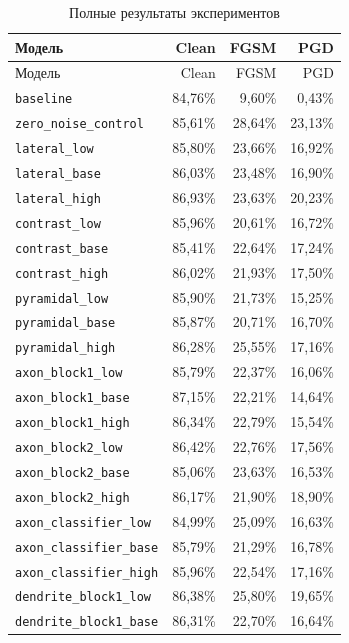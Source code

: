 \documentclass[a4paper]{article}
\begin{document}
\small
\begin{longtable}{p{5.6cm}rrr}
\caption{Полные результаты экспериментов}\label{tab:all-results}\\
\toprule
Модель & Clean & FGSM & PGD\\
\midrule
\endfirsthead
\toprule
Модель & Clean & FGSM & PGD\\
\midrule
\endhead
\texttt{baseline} & 84{,}76\% & 9{,}60\% & 0{,}43\%\\
\texttt{zero\_noise\_control} & 85{,}61\% & 28{,}64\% & 23{,}13\%\\
\texttt{lateral\_low} & 85{,}80\% & 23{,}66\% & 16{,}92\%\\
\texttt{lateral\_base} & 86{,}03\% & 23{,}48\% & 16{,}90\%\\
\texttt{lateral\_high} & 86{,}93\% & 23{,}63\% & 20{,}23\%\\
\texttt{contrast\_low} & 85{,}96\% & 20{,}61\% & 16{,}72\%\\
\texttt{contrast\_base} & 85{,}41\% & 22{,}64\% & 17{,}24\%\\
\texttt{contrast\_high} & 86{,}02\% & 21{,}93\% & 17{,}50\%\\
\texttt{pyramidal\_low} & 85{,}90\% & 21{,}73\% & 15{,}25\%\\
\texttt{pyramidal\_base} & 85{,}87\% & 20{,}71\% & 16{,}70\%\\
\texttt{pyramidal\_high} & 86{,}28\% & 25{,}55\% & 17{,}16\%\\
\texttt{axon\_block1\_low} & 85{,}79\% & 22{,}37\% & 16{,}06\%\\
\texttt{axon\_block1\_base} & 87{,}15\% & 22{,}21\% & 14{,}64\%\\
\texttt{axon\_block1\_high} & 86{,}34\% & 22{,}79\% & 15{,}54\%\\
\texttt{axon\_block2\_low} & 86{,}42\% & 22{,}76\% & 17{,}56\%\\
\texttt{axon\_block2\_base} & 85{,}06\% & 23{,}63\% & 16{,}53\%\\
\texttt{axon\_block2\_high} & 86{,}17\% & 21{,}90\% & 18{,}90\%\\
\texttt{axon\_classifier\_low} & 84{,}99\% & 25{,}09\% & 16{,}63\%\\
\texttt{axon\_classifier\_base} & 85{,}79\% & 21{,}29\% & 16{,}78\%\\
\texttt{axon\_classifier\_high} & 85{,}96\% & 22{,}54\% & 17{,}16\%\\
\texttt{dendrite\_block1\_low} & 86{,}38\% & 25{,}80\% & 19{,}65\%\\
\texttt{dendrite\_block1\_base} & 86{,}31\% & 22{,}70\% & 16{,}64\%\\

\end{longtable}
\end{document}
